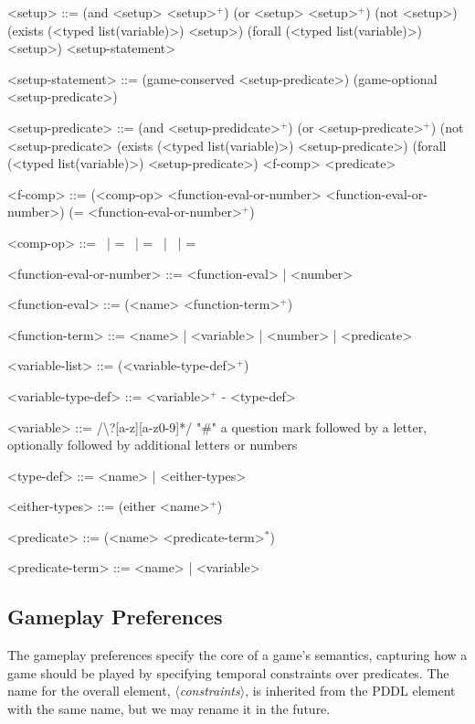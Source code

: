\documentclass{article}
\newcommand{\dsl}[1]{{\it $\langle$#1$\rangle$}}
\begin{document}
\begin{grammar}
<setup> ::= (and <setup> <setup>$^+$) \alt
    (or <setup> <setup>$^+$) \alt
    (not <setup>) \alt
    (exists (<typed list(variable)>) <setup>) \alt
    (forall (<typed list(variable)>) <setup>) \alt
    <setup-statement>

<setup-statement> ::= (game-conserved <setup-predicate>) \alt
    (game-optional <setup-predicate>)

<setup-predicate> ::= (and <setup-predidcate>$^+$) \alt
    (or <setup-predicate>$^+$) \alt
    (not <setup-predicate> \alt
    (exists (<typed list(variable)>) <setup-predicate>) \alt
    (forall (<typed list(variable)>) <setup-predicate>) \alt
    <f-comp> \alt
    <predicate>


<f-comp> ::= (<comp-op> <function-eval-or-number> <function-eval-or-number>) \alt
    (= <function-eval-or-number>$^+$)
    
<comp-op> ::=  \textlangle \ | \textlangle = \ | = \ | \textrangle \ | \textrangle =

<function-eval-or-number> ::= <function-eval> | <number>

<function-eval> ::= (<name> <function-term>$^+$)

<function-term> ::= <name> | <variable> | <number> | <predicate>

<variable-list> ::= (<variable-type-def>$^+$)

<variable-type-def> ::= <variable>$^+$ - <type-def>

<variable> ::= /\textbackslash?[a-z][a-z0-9]*/  "#" a question mark followed by a letter, optionally followed by additional letters or numbers

<type-def> ::= <name> | <either-types>

<either-types> ::= (either <name>$^+$)

<predicate> ::= (<name> <predicate-term>$^*$)

<predicate-term> ::= <name> | <variable>


\end{grammar}



\subsection{Gameplay Preferences} \label{sec:constraints}
The gameplay preferences specify the core of a game's semantics, capturing how a game should be played by specifying temporal constraints over predicates. 
The name for the overall element, \dsl{constraints}, is inherited from the PDDL element with the same name, but we may rename it in the future. 
\end{document}
